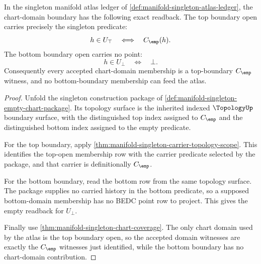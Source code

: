 \begin{theorem}
\label{thm:manifold-singleton-boundary-open-exactness}
In the singleton manifold atlas ledger of
\autoref{def:manifold-singleton-atlas-ledger}, the chart-domain boundary has
the following exact readback. The top boundary open carries precisely the
singleton predicate:
$$
h\in U_{\top}\quad\Longleftrightarrow\quad C_{\emp}(h).
$$
The bottom boundary open carries no point:
$$
h\in U_{\bot}\quad\Longleftrightarrow\quad \bot.
$$
Consequently every accepted chart-domain membership is a top-boundary
$C_{\emp}$ witness, and no bottom-boundary membership can feed the atlas.
\end{theorem}
\begin{proof}
Unfold the singleton construction package of
\autoref{def:manifold-singleton-empty-chart-package}. Its topology surface is
the inherited indexed $\TopologyUp$ boundary surface, with the distinguished
top index assigned to $C_{\emp}$ and the distinguished bottom index assigned to
the empty predicate.

For the top boundary, apply
\autoref{thm:manifold-singleton-carrier-topology-scope}. This identifies the
top-open membership row with the carrier predicate selected by the package,
and that carrier is definitionally $C_{\emp}$.

For the bottom boundary, read the bottom row from the same topology surface.
The package supplies no carried history in the bottom predicate, so a supposed
bottom-domain membership has no BEDC point row to project. This gives the
empty readback for $U_{\bot}$.

Finally use
\autoref{thm:manifold-singleton-chart-coverage}. The only chart domain used by
the atlas is the top boundary open, so the accepted domain witnesses are
exactly the $C_{\emp}$ witnesses just identified, while the bottom boundary has
no chart-domain contribution.
\end{proof}

